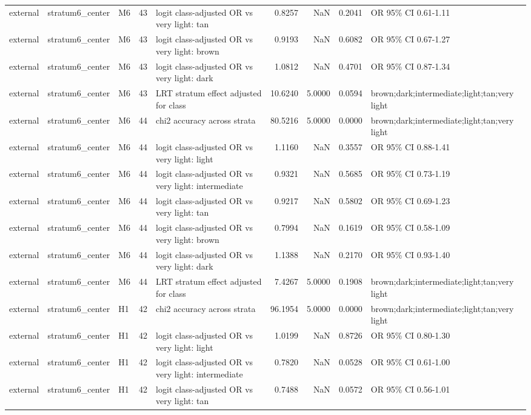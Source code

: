 \begin{tabular}{lllrlrrrl}
external & stratum6\_center & M6 & 43 & logit class-adjusted OR vs very light: tan & 0.8257 & NaN & 0.2041 & OR 95\% CI 0.61-1.11 \\
external & stratum6\_center & M6 & 43 & logit class-adjusted OR vs very light: brown & 0.9193 & NaN & 0.6082 & OR 95\% CI 0.67-1.27 \\
external & stratum6\_center & M6 & 43 & logit class-adjusted OR vs very light: dark & 1.0812 & NaN & 0.4701 & OR 95\% CI 0.87-1.34 \\
external & stratum6\_center & M6 & 43 & LRT stratum effect adjusted for class & 10.6240 & 5.0000 & 0.0594 & brown;dark;intermediate;light;tan;very light \\
external & stratum6\_center & M6 & 44 & chi2 accuracy across strata & 80.5216 & 5.0000 & 0.0000 & brown;dark;intermediate;light;tan;very light \\
external & stratum6\_center & M6 & 44 & logit class-adjusted OR vs very light: light & 1.1160 & NaN & 0.3557 & OR 95\% CI 0.88-1.41 \\
external & stratum6\_center & M6 & 44 & logit class-adjusted OR vs very light: intermediate & 0.9321 & NaN & 0.5685 & OR 95\% CI 0.73-1.19 \\
external & stratum6\_center & M6 & 44 & logit class-adjusted OR vs very light: tan & 0.9217 & NaN & 0.5802 & OR 95\% CI 0.69-1.23 \\
external & stratum6\_center & M6 & 44 & logit class-adjusted OR vs very light: brown & 0.7994 & NaN & 0.1619 & OR 95\% CI 0.58-1.09 \\
external & stratum6\_center & M6 & 44 & logit class-adjusted OR vs very light: dark & 1.1388 & NaN & 0.2170 & OR 95\% CI 0.93-1.40 \\
external & stratum6\_center & M6 & 44 & LRT stratum effect adjusted for class & 7.4267 & 5.0000 & 0.1908 & brown;dark;intermediate;light;tan;very light \\
external & stratum6\_center & H1 & 42 & chi2 accuracy across strata & 96.1954 & 5.0000 & 0.0000 & brown;dark;intermediate;light;tan;very light \\
external & stratum6\_center & H1 & 42 & logit class-adjusted OR vs very light: light & 1.0199 & NaN & 0.8726 & OR 95\% CI 0.80-1.30 \\
external & stratum6\_center & H1 & 42 & logit class-adjusted OR vs very light: intermediate & 0.7820 & NaN & 0.0528 & OR 95\% CI 0.61-1.00 \\
external & stratum6\_center & H1 & 42 & logit class-adjusted OR vs very light: tan & 0.7488 & NaN & 0.0572 & OR 95\% CI 0.56-1.01 \\

\end{tabular}
